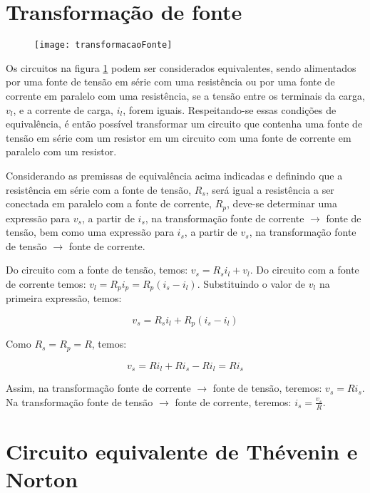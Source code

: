 \documentclass[12pt,fleqn]{book} %
\begin{document}
\section{Transformação de fonte}

\begin{figure}[!htbp] \centering\texttt{[image: transformacaoFonte]}
            \caption{}\label{transformacaoFonte} 
        \end{figure}
        
Os circuitos na figura \ref{transformacaoFonte} podem ser considerados equivalentes, sendo alimentados por uma fonte de tensão em série com uma resistência ou por uma fonte de corrente em paralelo com uma resistência, se a tensão entre os terminais da carga, $v_l$, e a corrente de carga, $i_l$, forem iguais. Respeitando-se essas condições de equivalência, é então possível transformar um circuito que contenha uma fonte de tensão em série com um resistor em um circuito com uma fonte de corrente em paralelo com um resistor.

Considerando as premissas de equivalência acima indicadas e definindo que a resistência em série com a fonte de tensão, $R_s$, será igual a resistência a ser conectada em paralelo com a fonte de corrente, $R_p$, deve-se determinar uma expressão para $v_s$, a partir de $i_s$, na transformação fonte de corrente $\rightarrow$ fonte de tensão, bem como uma expressão para $i_s$, a partir de $v_s$, na transformação fonte de tensão $\rightarrow$ fonte de corrente.

Do circuito com a fonte de tensão, temos: $v_s=R_s i_l+v_l$. Do circuito com a fonte de corrente temos: $v_l=R_p i_p=R_p (i_s-i_l )$. Substituindo o valor de $v_l$ na primeira expressão, temos:

\begin{equation}
v_s=R_s i_l+R_p (i_s-i_l )
\end{equation} 

Como $R_s=R_p=R$, temos:

\begin{equation}
v_s=Ri_l+Ri_s-Ri_l=Ri_s
\end{equation}

Assim, na transformação fonte de corrente $\rightarrow$ fonte de tensão, teremos: $v_s=Ri_s$. Na transformação fonte de tensão $\rightarrow$ fonte de corrente, teremos: $i_s= \frac{v_s}{R}$.


\section{Circuito equivalente de Thévenin e Norton}
    
\end{document}
